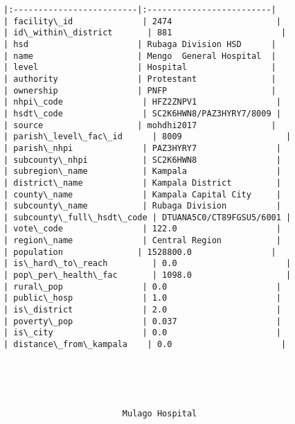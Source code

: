 \documentclass[11pt]{article}
\begin{document}
\begin{Verbatim}[commandchars=\\\{\}]
|:-------------------------|:-------------------------|
| facility\_id              | 2474                     |
| id\_within\_district       | 881                      |
| hsd                      | Rubaga Division HSD      |
| name                     | Mengo  General Hospital  |
| level                    | Hospital                 |
| authority                | Protestant               |
| ownership                | PNFP                     |
| nhpi\_code                | HFZ2ZNPV1                |
| hsdt\_code                | SC2K6HWN8/PAZ3HYRY7/8009 |
| source                   | mohdhi2017               |
| parish\_level\_fac\_id      | 8009                     |
| parish\_nhpi              | PAZ3HYRY7                |
| subcounty\_nhpi           | SC2K6HWN8                |
| subregion\_name           | Kampala                  |
| district\_name            | Kampala District         |
| county\_name              | Kampala Capital City     |
| subcounty\_name           | Rubaga Division          |
| subcounty\_full\_hsdt\_code | DTUANA5C0/CT89FGSU5/6001 |
| vote\_code                | 122.0                    |
| region\_name              | Central Region           |
| population               | 1528800.0                |
| is\_hard\_to\_reach         | 0.0                      |
| pop\_per\_health\_fac       | 1098.0                   |
| rural\_pop                | 0.0                      |
| public\_hosp              | 1.0                      |
| is\_district              | 2.0                      |
| poverty\_pop              | 0.037                    |
| is\_city                  | 0.0                      |
| distance\_from\_kampala    | 0.0                      |





                        Mulago Hospital                         


\end{Verbatim}
\end{document}
